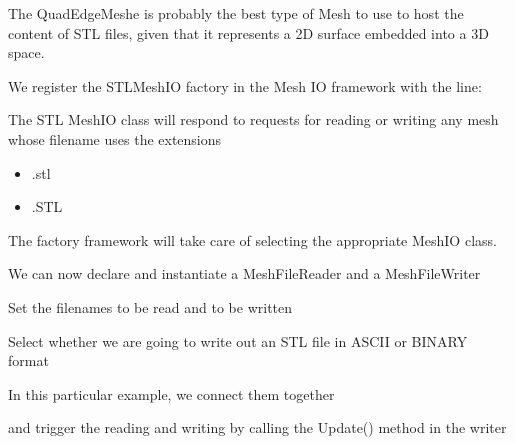 \documentclass{InsightArticle}
\begin{document}
The QuadEdgeMeshe is probably the best type of Mesh to use to host the content
of STL files, given that it represents a 2D surface embedded into a 3D space.

We register the STLMeshIO factory in the Mesh IO framework with the line:

\begin{center}
\lstset{firstnumber=40}

\end{center}

The STL MeshIO class will respond to requests for reading or writing any mesh whose filename uses the extensions

\begin{itemize}
\item .stl
\item .STL
\end{itemize}

The factory framework will take care of selecting the appropriate MeshIO class.

We can now declare and instantiate a MeshFileReader and a MeshFileWriter

\begin{center}
\lstset{firstnumber=42}

\end{center}

Set the filenames to be read and to be written

\begin{center}
\lstset{firstnumber=48}

\end{center}

Select whether we are going to write out an STL file in ASCII or BINARY format

\begin{center}
\lstset{firstnumber=51}

\end{center}

In this particular example, we connect them together

\begin{center}
\lstset{firstnumber=69}

\end{center}

and trigger the reading and writing by calling the Update() method in the writer
\end{document}
